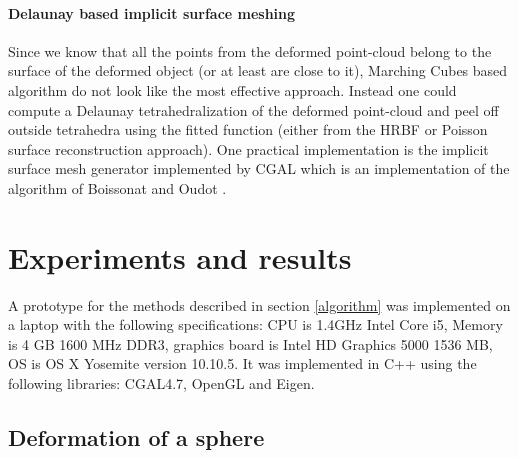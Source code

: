 \documentclass[ams]{U-AizuGT}
\begin{document}
\paragraph{Delaunay based implicit surface meshing}
\label{Delaunay_mesh}
Since we know that all the points from the deformed point-cloud belong to the surface 
of the deformed object (or at least are close to it), 
Marching Cubes based algorithm do not look like the most effective approach.
Instead one could compute a Delaunay tetrahedralization of the deformed point-cloud and peel off outside 
tetrahedra using the fitted function (either from the HRBF or Poisson surface reconstruction approach).
One practical implementation is the implicit surface mesh generator implemented by CGAL
which is an implementation of the algorithm of Boissonat and Oudot \cite{BO05}.


\section{Experiments and results}
A prototype for the methods described in section \ref{algorithm} was implemented on a laptop
with the following specifications: CPU is 1.4GHz Intel Core i5, Memory is 4 GB 1600 MHz DDR3, 
graphics board is Intel HD Graphics 5000 1536 MB, 
OS is OS X Yosemite version 10.10.5. 
It was implemented in C++ using the following libraries: CGAL4.7, OpenGL and Eigen.


\subsection{Deformation of a sphere}
\end{document}
